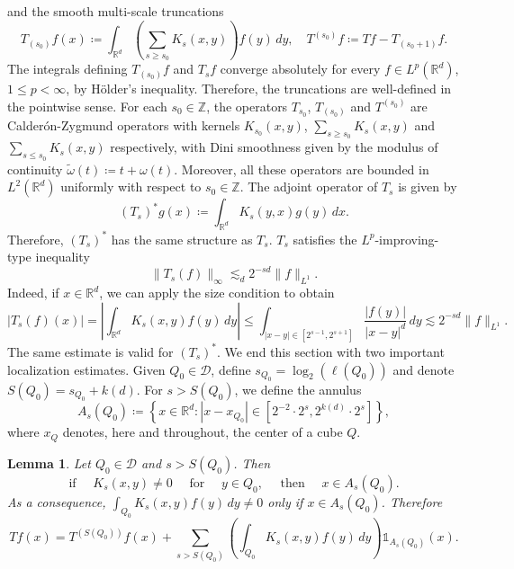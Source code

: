 \documentclass[12pt]{amsart}
\newcommand{\R}{\mathbb{R}}
\newcommand{\Z}{\mathbb{Z}}
\newcommand{\one}{\mathds{1}}
\newcommand{\D}{\mathscr{D}}
\theoremstyle{plain}
\newtheorem{lemma}[theorem]{Lemma}
\theoremstyle{definition} %
\numberwithin{equation}{section}
\begin{document}
and the smooth multi-scale truncations
$$
T_{(s_0)}f(x)\coloneqq \int_{\R^d}\left(\sum_{s\geq s_0} K_s(x,y)\right)f(y)\, dy, \quad T^{(s_0)}f \coloneqq Tf-T_{(s_0+1)}f.
$$
The integrals defining $T_{(s_0)}f$ and $T_s f$ converge absolutely for every $f\in L^p(\R^d)$, $1\leq p<\infty$, by Hölder's inequality. Therefore, the truncations are well-defined in the pointwise sense. For each $s_0\in \Z$, the operators $T_{s_0}$, $T_{(s_0)}$ and $T^{(s_0)}$ are Calder\'on-Zygmund operators with kernels $K_{s_0}(x,y)$, $\sum_{s\geq s_0}K_s(x,y)$ and $\sum_{s\leq s_0}K_s(x,y)$ respectively, with Dini smoothness given by the modulus of continuity $\widetilde{\omega}(t)\coloneqq t+\omega(t)$. Moreover, all these operators are bounded in $L^2(\R^d)$ uniformly with respect to $s_0\in\Z$. The adjoint operator of $T_s$ is given by
\[
(T_s)^{\ast}g(x)
\coloneqq 
\int_{\R^d}K_{s}(y,x)g(y)\, dx.
\]
Therefore, $(T_s)^{\ast}$ has the same structure as $T_s$. $T_s$ satisfies the $L^p$-improving-type inequality
\begin{equation}\label{singleScale1infty}
\|T_s(f)\|_{\infty} \lesssim_{d} 2^{-sd}\|f\|_{L^1}.    
\end{equation}
Indeed, if $x\in\R^d$, we can apply the size condition to obtain
\[
|T_s(f)(x)|
=
\left|
\int_{\R^d}K_s(x,y)f(y)\, dy
\right|
\leq 
\int_{|x-y|\in [2^{s-1},2^{s+1}]}\frac{|f(y)|}{|x-y|^d}\, dy
\lesssim 
2^{-sd}\|f\|_{L^1}.
\]
The same estimate is valid for $(T_s)^{\ast}$. We end this section with two important localization estimates. Given $Q_0 \in \D$, define $s_{Q_0} =\log_2(\ell(Q_0))$ and denote $S(Q_0) = s_{Q_0} + k(d)$. For $s > S(Q_0)$, we define the annulus
\begin{equation*}
A_{s}(Q_0) \coloneqq
\left\{x\in\R^d: |x-x_{Q_0}|\in [2^{-2}\cdot 2^{s},2^{k(d)}\cdot 2^{s}]
\right\},
\end{equation*}
where $x_Q$ denotes, here and throughout, the center of a cube $Q$.

\begin{lemma}\label{lemmaAnnuliDecomposition}
    Let $Q_0\in\D$ and $s>S(Q_0)$. Then 
    \begin{equation}\label{annuliProperty1}
        \text{if }\quad K_s(x,y)\neq 0\quad \text{ for }\quad y\in Q_0,\quad \text{ then }\quad  x\in A_s(Q_0).
    \end{equation}
    As a consequence, $\int_{Q_0} K_s(x,y)f(y)\, dy\neq 0$ only if $x\in A_s(Q_0)$. Therefore
    \begin{equation}\label{annuliDecomposition}
    Tf(x)
    =
    T^{(S(Q_0))}f(x)
    +
    \sum_{s>S(Q_0)}
    \left(\int_{Q_0} K_s(x,y)f(y)\, dy\right) \one_{A_{s}(Q_0)}(x).
    \end{equation}
\end{lemma}
\end{document}
